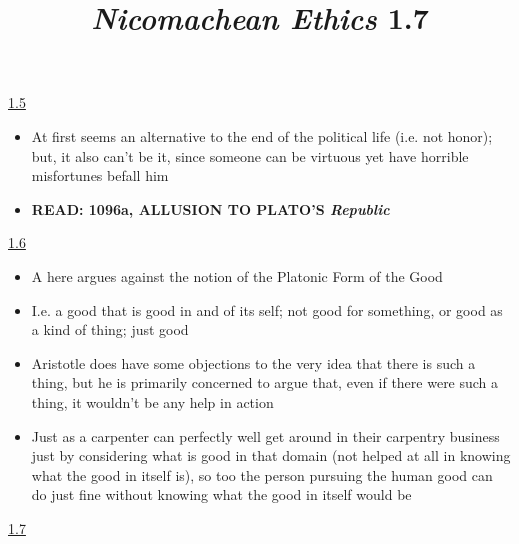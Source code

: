 \documentclass[11pt]{article}
\title{\emph{Nicomachean Ethics} 1.7}
\author{}
\date{}
\begin{document}
\maketitle

\noindent\underline{1.5}

\begin{itemize}\item{At first seems an alternative to the end of the political life (i.e. not honor); but, it also can't be it, since someone can be virtuous yet have horrible misfortunes befall him}\item{\textbf{READ: 1096a, ALLUSION TO PLATO'S \emph{Republic}}}
\end{itemize}

\noindent\underline{1.6}

\begin{itemize}\item{A here argues against the notion of the Platonic Form of the Good}\item{I.e. a good that is good in and of its self; not good for something, or good as a kind of thing; just good}\item{Aristotle does have some objections to the very idea that there is such a thing, but he is primarily concerned to argue that, even if there were such a thing, it wouldn't be any help in action}\item{Just as a carpenter can perfectly well get around in their carpentry business just by considering what is good in that domain (not helped at all in knowing what the good in itself is), so too the person pursuing the human good can do just fine without knowing what the good in itself would be}\end{itemize}

\noindent\underline{1.7}
\end{document}

